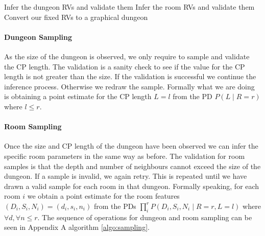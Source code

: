 \documentclass{UoYCSproject}
\begin{document}
\begin{outline}[enumerate]
  \1 Infer the dungeon RVs and validate them
  \1 Infer the room RVs and validate them
  \1 Convert our fixed RVs to a graphical dungeon
\end{outline}


\paragraph{Dungeon Sampling}
 As the size of the dungeon is observed, we only require to sample and validate the CP length. The validation is a sanity check to see if the value for the CP length is not greater than the size. If the validation is successful we continue the inference process. Otherwise we redraw the sample. Formally what we are doing is obtaining a point estimate for the CP length \(L=l\) from the PD \(P(L\mid R = r)\) where \(l \le r\).

\paragraph{Room Sampling}
Once the size and CP length of the dungeon have been observed we can infer the specific room parameters in the same way as before. The validation for room samples is that the depth and number of neighbours cannot exceed the size of the dungeon. If a sample is invalid, we again retry. This is repeated until we have drawn a valid sample for each room in that dungeon. Formally speaking, for each room \(i\) we obtain a point estimate for the room features \((D_i, S_i, N_i) = (d_i, s_i, n_i)\) from the PDs \(\prod_{i}^{r} P(D_i, S_i, N_i \mid R =r, L = l)\) where \(\forall d, \forall n \le r\). The sequence of operations for dungeon and room sampling can be seen in Appendix A algorithm \ref{algo:sampling}.
\end{document}
